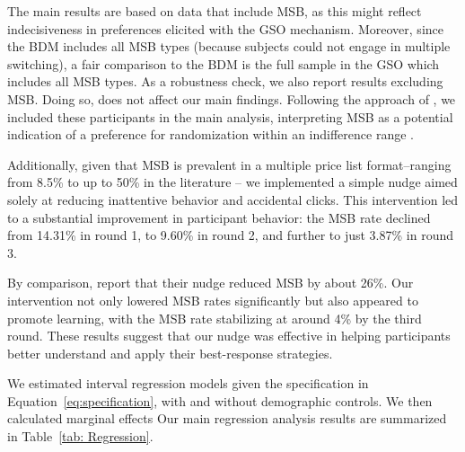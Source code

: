 \documentclass[12pt]{article}
\begin{document}
The main results are based on data that include MSB, as this might reflect indecisiveness in preferences elicited with the GSO mechanism. Moreover, since the BDM includes all MSB types (because subjects could not engage in multiple switching), a fair comparison to the BDM is the full sample in the GSO which includes all MSB types. As a robustness check, we also report results excluding MSB. Doing so, does not affect our main findings. Following the approach of \citet{brown2018separated}, we included these participants in the main analysis, interpreting MSB as a potential indication of a preference for randomization within an indifference range \citep{agranov2023stable}. 

Additionally, given that MSB is prevalent in a multiple price list format--ranging from 8.5\%  to up to 50\% in the literature \citep{yu2021multiple, filippin2016reconsideration}-- we implemented a simple nudge aimed solely at reducing inattentive behavior and accidental clicks. This intervention led to a substantial improvement in participant behavior: the MSB rate declined from 14.31\% in round 1, to 9.60\% in round 2, and further to just 3.87\% in round 3.

By comparison, \citet{yu2021multiple} report that their nudge reduced MSB by about 26\%. Our intervention not only lowered MSB rates significantly but also appeared to promote learning, with the MSB rate stabilizing at around 4\% by the third round. These results suggest that our nudge was effective in helping participants better understand and apply their best-response strategies. 

We estimated interval regression models given the specification in Equation~\ref{eq:specification}, with and without demographic controls. We then calculated marginal effects
Our main regression analysis results are summarized in Table~\ref{tab: Regression}. 
\end{document}
